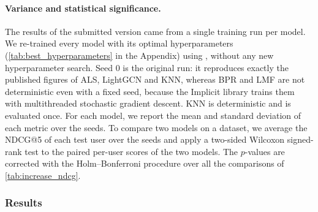 \begin{mmblock}
\paragraph{Variance and statistical significance.} The results of the submitted version came from a single training run per model. We re-trained every model with its optimal hyperparameters (\autoref{tab:best_hyperparameters} in the Appendix) using \RSseeds{}, without any new hyperparameter search. Seed $0$ is the original run: it reproduces exactly the published figures of ALS, LightGCN and KNN, whereas BPR and LMF are not deterministic even with a fixed seed, because the Implicit library trains them with multithreaded stochastic gradient descent. KNN is deterministic and is evaluated once. For each model, we report the mean and standard deviation of each metric over the seeds. To compare two models on a dataset, we average the NDCG@5 of each test user over the seeds and apply a two-sided Wilcoxon signed-rank test to the paired per-user scores of the two models. The $p$-values are corrected with the Holm--Bonferroni procedure over all the comparisons of \autoref{tab:increase_ndcg}.
\end{mmblock}

\subsubsection{Results}



